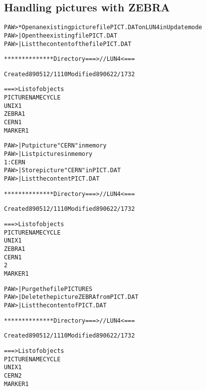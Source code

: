\subsection*{Handling pictures with ZEBRA}
\begin{alltt}
PAW > * Open an existing picture file PICT.DAT on LUN 4 in Update mode
PAW >   | Open the existing file PICT.DAT
PAW >                       | List the content of the file PICT.DAT
 
************** Directory ===> //LUN4 <===
 
                 Created 890512/1110  Modified 890622/1732
 
===> List of objects
              PICTURE   NAME                          CYCLE
    UNIX                                                 1
    ZEBRA                                                1
    CERN                                                 1
    MARKER                                               1
 
PAW >                  | Put picture "CERN" in memory
PAW >                  | List pictures in memory
 1: CERN
PAW >                 | Store picture "CERN" in PICT.DAT
PAW >                       | List the content PICT.DAT
 
************** Directory ===> //LUN4 <===
 
                 Created 890512/1110  Modified 890622/1732
 
===> List of objects
              PICTURE   NAME                          CYCLE
    UNIX                                                 1
    ZEBRA                                                1
    CERN                                                 1
                                                         2
    MARKER                                               1
 
PAW >                      | Purge the file PICTURES
PAW >              | Delete the picture ZEBRA from PICT.DAT
PAW >                       | List the content of PICT.DAT
 
************** Directory ===> //LUN4 <===
 
                 Created 890512/1110  Modified 890622/1732
 
===> List of objects
              PICTURE   NAME                          CYCLE
    UNIX                                                 1
    CERN                                                 2
    MARKER                                               1
\end{alltt}

